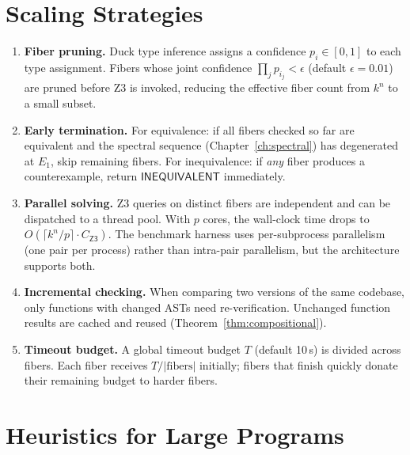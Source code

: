 \section{Scaling Strategies}

\begin{enumerate}
  \item \textbf{Fiber pruning.}
    Duck type inference assigns a confidence $p_i \in [0, 1]$ to each
    type assignment.  Fibers whose joint confidence
    $\prod_j p_{i_j} < \epsilon$ (default $\epsilon = 0.01$)
    are pruned before Z3 is invoked, reducing the effective fiber
    count from $k^n$ to a small subset.

  \item \textbf{Early termination.}
    For equivalence: if all fibers checked so far are equivalent and
    the spectral sequence (Chapter~\ref{ch:spectral}) has degenerated
    at $E_1$, skip remaining fibers.
    For inequivalence: if \emph{any} fiber produces a counterexample,
    return $\mathsf{INEQUIVALENT}$ immediately.

  \item \textbf{Parallel solving.}
    Z3 queries on distinct fibers are independent and can be
    dispatched to a thread pool.  With $p$ cores, the wall-clock
    time drops to $O(\lceil k^n / p \rceil \cdot C_\mathsf{Z3})$.
    The benchmark harness uses per-subprocess parallelism (one
    pair per process) rather than intra-pair parallelism, but the
    architecture supports both.

  \item \textbf{Incremental checking.}
    When comparing two versions of the same codebase, only functions
    with changed ASTs need re-verification.  Unchanged function
    results are cached and reused
    (Theorem~\ref{thm:compositional}).

  \item \textbf{Timeout budget.}
    A global timeout budget $T$ (default 10\,s) is divided across
    fibers.  Each fiber receives $T / |\mathrm{fibers}|$ initially;
    fibers that finish quickly donate their remaining budget to
    harder fibers.
\end{enumerate}

\section{Heuristics for Large Programs}

